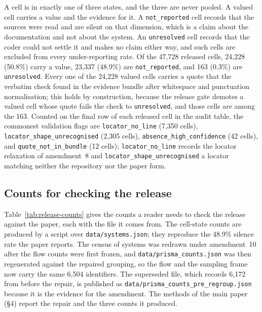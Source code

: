 A cell is in exactly one of three states, and the three are never pooled. A valued cell carries a
value and the evidence for it. A \texttt{not\_reported} cell records that the sources were read and
are silent on that dimension, which is a claim about the documentation and not about the system. An
\texttt{unresolved} cell records that the coder could not settle it and makes no claim either way,
and such cells are excluded from every under-reporting rate.
Of the 47,728 released cells, 24,228 (50.8\%) carry a value, 23,337 (48.9\%) are
\texttt{not\_reported}, and 163 (0.3\%) are \texttt{unresolved}.
Every one of the 24,228 valued cells carries a quote that the verbatim check found in the evidence
bundle after whitespace and punctuation normalisation; this holds by construction, because the release
gate demotes a valued cell whose quote fails the check to \texttt{unresolved}, and those cells are among
the 163. Counted on the final row of each released cell in the audit table, the commonest validation
flags are \texttt{locator\_no\_line} (7,350 cells), \texttt{locator\_shape\_unrecognised} (2,305 cells),
\texttt{absence\_high\_confidence} (42 cells), and \texttt{quote\_not\_in\_bundle} (12 cells);
\texttt{locator\_no\_line} records the locator relaxation of amendment~8 and
\texttt{locator\_shape\_unrecognised} a locator matching neither the repository nor the paper form.

\subsection{Counts for checking the release}
\label{subsec:release-counts}

Table~\ref{tab:release-counts} gives the counts a reader needs to check the release against the
paper, each with the file it comes from. The cell-state counts are produced by a script over
\texttt{data/systems.json}; they reproduce the 48.9\% silence rate the paper reports.
The census of systems was redrawn under amendment~10 after the flow counts were first frozen, and
\texttt{data/prisma\_counts.json} was then regenerated against the repaired grouping, so the flow and the
sampling frame now carry the same 6,504 identifiers. The superseded file, which records 6,172 from before
the repair, is published as \texttt{data/prisma\_counts\_pre\_regroup.json} because it is the evidence
for the amendment. The methods of the main paper (\S4) report the repair and the three counts it produced.


